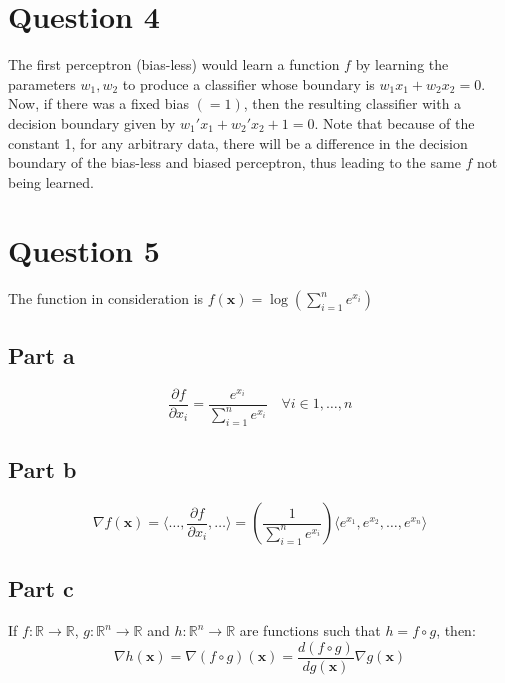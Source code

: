 \documentclass{article}
\newcommand{\dO}{\partial}
\begin{document}
\section*{Question 4}
\begin{flushleft}
The first perceptron (bias-less) would learn a function \(f\) by learning the parameters \(w_1, w_2\) to produce a classifier whose boundary is \(w_1 x_1 + w_2 x_2 = 0\). Now, if there was a fixed bias \(( = 1)\), then the resulting classifier with a decision boundary given by \(w_1' x_1 + w_2' x_2 + 1 = 0\). Note that because of the constant 1, for any arbitrary data, there will be a difference in the decision boundary of the bias-less and biased perceptron, thus leading to the same \(f\) not being learned.
\end{flushleft}

\section*{Question 5}
The function in consideration is \(f(\mathbf{x}) = \displaystyle \log\left(\sum_{i=1}^{n} e^{x_i}\right)\)
\subsection*{Part a}
\begin{flushleft}
\begin{equation}
\frac{\dO f}{\dO x_{i}} = \frac{e^{x_i}}{\displaystyle \sum_{i=1}^{n} e^{x_i}} \quad \forall i \in 1, \ldots, n
\end{equation}
\end{flushleft}

\subsection*{Part b}
\begin{flushleft}
\begin{equation}
\nabla f(\mathbf{x}) = \langle \ldots, \frac{\dO f}{\dO x_{i}}, \ldots\rangle = \left(\frac{1}{\displaystyle \sum_{i=1}^{n} e^{x_i}}\right) \langle e^{x_1}, e^{x_2}, \ldots, e^{x_n}\rangle
\end{equation}
\end{flushleft}

\subsection*{Part c}
\begin{flushleft}
If \(f : \mathbb{R} \to \mathbb{R}\), \(g : \mathbb{R}^{n} \to \mathbb{R}\) and \(h : \mathbb{R}^{n} \to \mathbb{R}\) are functions such that \(h = f \circ g\), then:
\begin{equation}
\nabla h(\mathbf{x}) = \nabla (f \circ g)(\mathbf{x}) = \frac{d(f \circ g)}{dg(\mathbf{x})} \nabla g(\mathbf{x})
\end{equation}
\end{flushleft}
\end{document}
